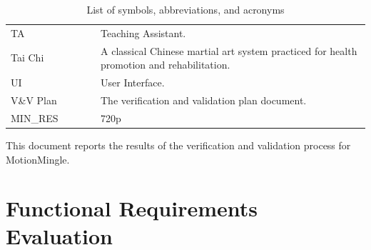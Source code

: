 \documentclass[12pt, titlepage]{article}
\begin{document}
\begin{table}[H]
\begin{tabular}{L{0.25\linewidth}L{0.8\linewidth}}
    TA                         & Teaching Assistant.                                                                                                                                                                \\
    Tai Chi                    & A classical Chinese martial art system practiced for health promotion and rehabilitation.                                                                                          \\
    UI                         & User Interface.                                                                                                                                                                    \\
    V\&V Plan                  & The verification and validation plan document.                                                                                                                                     \\
    MIN\_RES \label{const:res} & 720p                                                                                                                                                                               \\ \bottomrule
  \end{tabular}
  \caption{List of symbols, abbreviations, and acronyms}
  \label{tab:abbrv}
\end{table}

\newpage

\tableofcontents

\listoftables %

\listoffigures %

\newpage


This document reports the results of the verification and validation process for
MotionMingle.

\section{Functional Requirements Evaluation}
\end{document}
